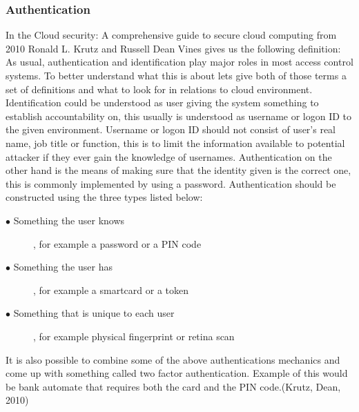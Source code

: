 \documentclass{article}
\begin{document}
\subsubsection{Authentication}
In the Cloud security: A comprehensive guide to secure cloud computing from 2010 Ronald L. Krutz and Russell Dean Vines gives us the following definition: As usual, authentication and identification play major roles in most access control systems. To better understand what this is about lets give both of those terms a set of definitions and what to look for in relations to cloud environment.
Identification could be understood as user giving the system something to establish accountability on, this usually is understood as username or logon ID to the given environment. Username or logon ID should not consist of user's real name, job title or function, this is to limit the information available to potential attacker if they ever gain the knowledge of usernames. Authentication on the other hand is the means of making sure that the identity given is the correct one, this is commonly implemented by using a password. Authentication should be constructed using the three types listed below:
\begin{description}
        \item[$\bullet$ Something the user knows], for example a password or a PIN code
        \item[$\bullet$ Something the user has], for example a smartcard or a token
        \item[$\bullet$ Something that is unique to each user], for example physical fingerprint or retina scan
\end{description}
It is also possible to combine some of the above authentications mechanics and come up with something called two factor authentication. Example of this would be bank automate that requires both the card and the PIN code.(Krutz, Dean, 2010)
\end{document}
